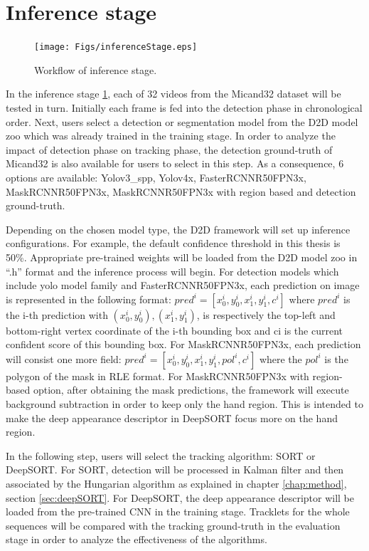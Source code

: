 \section{Inference stage}\label{sec:inferstage}
\begin{figure}[htbp]
	\centerline{\texttt{[image: Figs/inferenceStage.eps]}}
	\caption{Workflow of inference stage.}
	\label{fig:inferenceStage}
\end{figure}
In the inference stage \ref{fig:inferenceStage}, each of 32 videos from the Micand32 dataset will be tested in turn. Initially each frame is fed into the detection phase in chronological order. Next, users select a detection or segmentation model from the D2D model zoo which was already trained in the training stage. In order to analyze the impact of detection phase on tracking phase, the detection ground-truth of Micand32 is also available for users to select in this step. As a consequence, 6 options are available: Yolov3\_spp, Yolov4x, FasterRCNNR50FPN3x, MaskRCNNR50FPN3x, MaskRCNNR50FPN3x with region based and detection ground-truth.

Depending on the chosen model type, the D2D framework will set up inference configurations. For example, the default confidence threshold in this thesis is 50\%. Appropriate pre-trained weights will be loaded from the D2D model zoo in “.h” format and the inference process will begin. For detection models which include yolo model family and FasterRCNNR50FPN3x, each prediction on image is represented in the following format: \(pred^i = [x_0^i, y_0^i, x_1^i, y_1^i, c^i]\) where \(pred^i\) is the i-th prediction with \((x_0^i, y_0^i),  (x_1^i, y_1^i)\), is respectively the top-left and bottom-right vertex coordinate of the i-th bounding box and ci is the current confident score of this bounding box. For MaskRCNNR50FPN3x, each prediction will consist one more field: \(pred^i = [x_0^i, y_0^i, x_1^i, y_1^i, pol^i, c^i]\) where the \(pol^i\) is the polygon of the mask in RLE format. For MaskRCNNR50FPN3x with region-based option, after obtaining the mask predictions, the framework will execute background subtraction in order to keep only the hand region. This is intended to make the deep appearance descriptor in DeepSORT focus more on the hand region.

In the following step, users will select the tracking algorithm: SORT or DeepSORT. For SORT, detection will be processed in Kalman filter and then associated by the Hungarian algorithm as explained in chapter \ref{chap:method}, section \ref{sec:deepSORT}. For DeepSORT, the deep appearance descriptor will be loaded from the pre-trained CNN in the training stage. Tracklets for the whole sequences will be compared with the tracking ground-truth in the evaluation stage in order to analyze the effectiveness of the algorithms.

